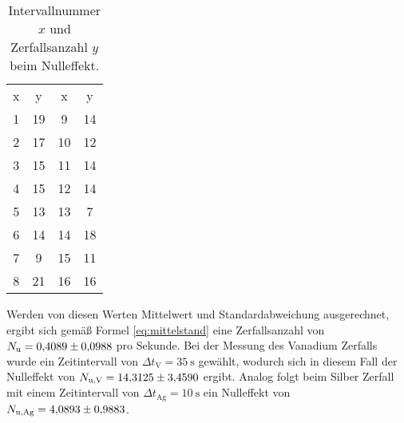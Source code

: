 \begin{table}[H]
    \centering
    \caption[short]{Intervallnummer $x$ und Zerfallsanzahl $y$ beim Nulleffekt.}
    \label{tab:nulleffekt}
    \begin{tabular}{S S S S}
        \toprule
        {x} & {y} & {x} & {y} \\
        \cmidrule(lr){1-2}\cmidrule(lr){3-4}
        1 & 19 &  9 & 14 \\
        2 & 17 & 10 & 12 \\
        3 & 15 & 11 & 14 \\
        4 & 15 & 12 & 14 \\
        5 & 13 & 13 &  7 \\
        6 & 14 & 14 & 18 \\
        7 &  9 & 15 & 11 \\
        8 & 21 & 16 & 16 \\
        \bottomrule
    \end{tabular}
\end{table}

\noindent
Werden von diesen Werten Mittelwert und Standardabweichung ausgerechnet, ergibt sich gemäß Formel \eqref{eq:mittelstand} 
eine Zerfallsanzahl von $N_\text{u} = \num[]{0.4089 +- 0.0988}$ pro Sekunde.
Bei der Messung des Vanadium Zerfalls wurde ein Zeitintervall von $\Delta t_\text{V} = \qty[]{35}{\second}$ gewählt, 
wodurch sich in diesem Fall der Nulleffekt von $N_\text{u,V} = \num[]{14.3125 +- 3.4590}$ ergibt.
Analog folgt beim Silber Zerfall mit einem Zeitintervall von $\Delta t_\text{Ag} = \qty[]{10}{\second}$ ein Nulleffekt von 
$N_\text{u,Ag} = \num[]{4.0893 +- 0.9883}$.


